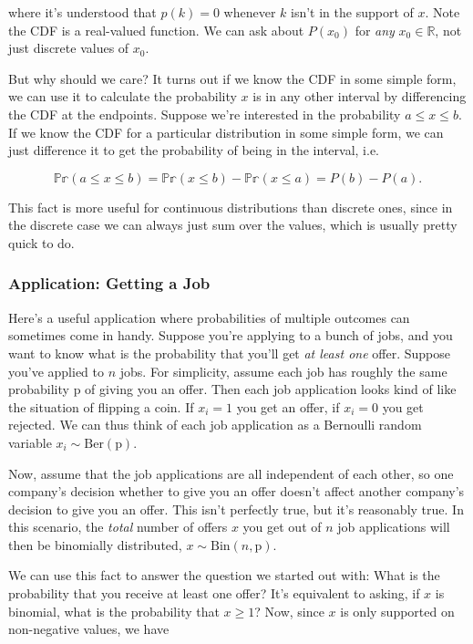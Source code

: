 \documentclass[
  letterpaper,
  DIV=11,
  numbers=noendperiod]{scrreprt}
\begin{document}
where it's understood that \(p(k)=0\) whenever \(k\) isn't in the
support of \(x\). Note the CDF is a real-valued function. We can ask
about \(P(x_0)\) for \emph{any} \(x_0 \in \mathbb{R}\), not just
discrete values of \(x_0\).

But why should we care? It turns out if we know the CDF in some simple
form, we can use it to calculate the probability \(x\) is in any other
interval by differencing the CDF at the endpoints. Suppose we're
interested in the probability \(a \leq x \leq b\). If we know the CDF
for a particular distribution in some simple form, we can just
difference it to get the probability of being in the interval, i.e.

\[\mathbb{Pr}(a \leq x \leq b) = \mathbb{Pr}(x \leq b) - \mathbb{Pr}(x \leq a) = P(b) - P(a).\]

This fact is more useful for continuous distributions than discrete
ones, since in the discrete case we can always just sum over the values,
which is usually pretty quick to do.

\hypertarget{application-getting-a-job}{%
\subsubsection{Application: Getting a
Job}\label{application-getting-a-job}}

Here's a useful application where probabilities of multiple outcomes can
sometimes come in handy. Suppose you're applying to a bunch of jobs, and
you want to know what is the probability that you'll get \emph{at least
one} offer. Suppose you've applied to \(n\) jobs. For simplicity, assume
each job has roughly the same probability \(\text{p}\) of giving you an
offer. Then each job application looks kind of like the situation of
flipping a coin. If \(x_i=1\) you get an offer, if \(x_i=0\) you get
rejected. We can thus think of each job application as a Bernoulli
random variable \(x_i \sim \text{Ber}(\text{p})\).

Now, assume that the job applications are all independent of each other,
so one company's decision whether to give you an offer doesn't affect
another company's decision to give you an offer. This isn't perfectly
true, but it's reasonably true. In this scenario, the \emph{total}
number of offers \(x\) you get out of \(n\) job applications will then
be binomially distributed, \(x \sim \text{Bin}(n, \text{p})\).

We can use this fact to answer the question we started out with: What is
the probability that you receive at least one offer? It's equivalent to
asking, if \(x\) is binomial, what is the probability that \(x \geq 1\)?
Now, since \(x\) is only supported on non-negative values, we have
\end{document}
